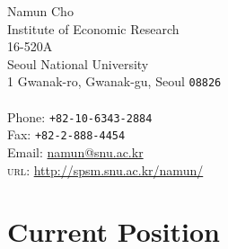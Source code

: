 \documentclass[11pt, a4paper]{article} %
\begin{document}

{\LARGE Namun Cho}\\[1cm] %
Institute of Economic Research\\ %
16-520A\\
Seoul National University\\
1 Gwanak-ro, Gwanak-gu, Seoul \texttt{08826}\\
\\[.2cm]
Phone: \texttt{+82-10-6343-2884}\\ %
Fax: \texttt{+82-2-888-4454}\\[.2cm] %
Email: \href{mailto:namun@snu.ac.kr}{namun@snu.ac.kr}\\ %
\textsc{url}: \href{http://spsm.snu.ac.kr/namun/}{http://spsm.snu.ac.kr/namun/}\\ %






\section*{Current Position}
\end{document}
